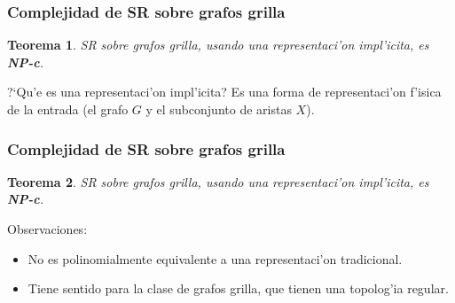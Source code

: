 \documentclass{beamer}
\newcommand{\class}[1]{\textnormal{\textbf{#1}}}
\newcommand{\probl}[1]{\textnormal{\textsf{#1}}}
\newtheorem*{thm}{Teorema}
\begin{document}
\begin{frame}
\frametitle{Complejidad de \probl{SR} sobre grafos grilla}

\pause

\begin{thm}
\probl{SR} sobre grafos grilla, usando una \textit{representaci'on impl'icita}, es \class{NP-c}.
\end{thm}

\pause
\vspace{3mm}
?`Qu'e es una representaci'on impl'icita? \pause Es una forma de representaci'on f'isica de la entrada (el grafo $G$ y el subconjunto de aristas $X$).

\pause

\begin{figure}
	\begin{center}
		
	\end{center}	
\end{figure}

\end{frame}

\begin{frame}
\frametitle{Complejidad de \probl{SR} sobre grafos grilla}

\begin{thm}
\probl{SR} sobre grafos grilla, usando una \textit{representaci'on impl'icita}, es \class{NP-c}.
\end{thm}

\vspace{3mm}

Observaciones:
\pause
\begin{itemize}
	\item No es polinomialmente equivalente a una representaci'on tradicional.
	\pause
	\item Tiene sentido para la clase de grafos grilla, que tienen una topolog'ia regular.
\end{itemize}

\end{frame}
\end{document}
